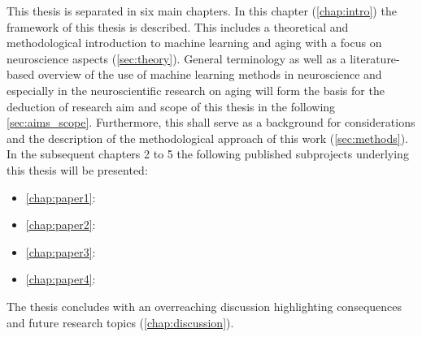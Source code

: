 This thesis is separated in six main chapters. In this chapter (\autoref{chap:intro}) the framework of this thesis is described. This includes a theoretical and methodological introduction to machine learning and aging with a focus on neuroscience aspects (\autoref{sec:theory}).  General terminology as well as a literature-based overview of the use of machine learning methods in neuroscience and especially in the neuroscientific research on aging will form the basis for the deduction of research aim and scope of this thesis in the following \autoref{sec:aims_scope}. Furthermore, this shall serve as a background for considerations and the description of the methodological approach of this work (\autoref{sec:methods}). In the subsequent chapters 2 to 5 the following published subprojects underlying this thesis will be presented:

\begin{itemize}
\item \autoref{chap:paper1}: 
\item \autoref{chap:paper2}: 
\item \autoref{chap:paper3}: 
\item \autoref{chap:paper4}: 
\end{itemize}

The thesis concludes with an overreaching discussion highlighting consequences and future research topics (\autoref{chap:discussion}).
